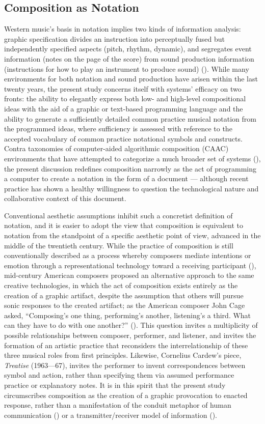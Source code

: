 \subsection{Composition as Notation}
Western music's basis in notation implies two kinds of information analysis: graphic specification divides an instruction into perceptually fused but independently specified aspects (pitch, rhythm, dynamic), and segregates event information (notes on the page of the score) from sound production information (instructions for how to play an instrument to produce sound) (\cite[83]{Ariza2005}). While many environments for both notation and sound production have arisen within the last twenty years, the present study concerns itself with systems' efficacy on two fronts: the ability to elegantly express both low- and high-level compositional ideas with the aid of a graphic or text-based programming language and the ability to generate a sufficiently detailed common practice musical notation from the programmed ideas, where sufficiency is assessed with reference to the accepted vocabulary of common practice notational symbols and constructs. Contra taxonomies of computer-aided algorithmic composition (CAAC) environments that have attempted to categorize a much broader set of systems (\cite{Ariza2005b}), the present discussion redefines composition narrowly as the act of programming a computer to create a notation in the form of a document --- although recent practice has shown a healthy willingness to question the technological nature and collaborative context of this document.

Conventional aesthetic assumptions inhibit such a concretist definition of notation, and it is easier to adopt the view that composition is equivalent to notation from the standpoint of a specific aesthetic point of view, advanced in the middle of the twentieth century. While the practice of composition is still conventionally described as a process whereby composers mediate intentions or emotion through a representational technology toward a receiving participant (\cite{Davies:1994qf}), mid-century American composers proposed an alternative approach to the same creative technologies, in which the act of composition exists entirely as the creation of a graphic artifact, despite the assumption that others will pursue sonic responses to the created artifact; as the American composer John Cage asked, ``Composing’s one thing, performing’s another, listening’s a third. What can they have to do with one another?'' (\cite[14]{Cage:2011dq}). This question invites a multiplicity of possible relationships between composer, performer, and listener, and invites the formation of an artistic practice that reconsiders the interrelationship of these three musical roles from first principles. Likewise, Cornelius Cardew's piece, \emph{Treatise} (1963---67), invites the performer to invent correspondences between symbol and action, rather than specifying them via assumed performance practice or explanatory notes. It is in this spirit that the present study circumscribes composition as the creation of a graphic provocation to enacted response, rather than a manifestation of the conduit metaphor of human communication (\cite{Reddy:1979oq}) or a transmitter/receiver model of information (\cite{Shannon:1949tg}).

